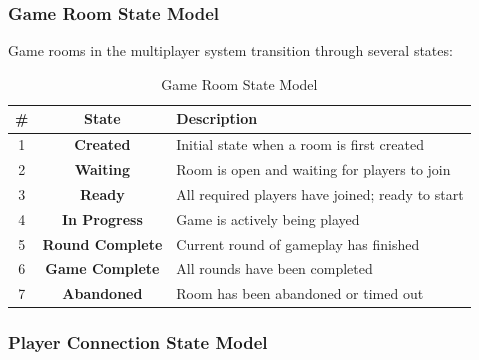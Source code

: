 \subsubsection{Game Room State Model}

Game rooms in the multiplayer system transition through several states:

\begin{table}[H]
    \centering
    \begin{tabular}{|c|c|l|}
        \hline
        \textbf{\#} & \textbf{State} & \textbf{Description} \\
        \hline
        1 & \textbf{Created} & Initial state when a room is first created \\
        \hline
        2 & \textbf{Waiting} & Room is open and waiting for players to join \\
        \hline
        3 & \textbf{Ready} & All required players have joined; ready to start \\
        \hline
        4 & \textbf{In Progress} & Game is actively being played \\
        \hline
        5 & \textbf{Round Complete} & Current round of gameplay has finished \\
        \hline
        6 & \textbf{Game Complete} & All rounds have been completed \\
        \hline
        7 & \textbf{Abandoned} & Room has been abandoned or timed out \\
        \hline
    \end{tabular}
    \caption{Game Room State Model}
    \label{tab:game-room-states}
\end{table}



\subsubsection{Player Connection State Model}

